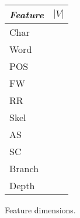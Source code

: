 \begin{figure*}[ht!]
{\footnotesize

\begin{tabular}{ll}

    \emph{Feature} & $|V|$ \\
    \hline
    Char & \\
    Word & \\
    POS & \\
    FW & \\
    \hline
    RR & \\
    Skel & \\
    AS & \\
    SC & \\
    Branch & \\
    Depth & \\
    \hline

\end{tabular}

\caption{
{\small Feature dimensions.
}}
\label{fig:dimensions}
}

\end{figure*}

